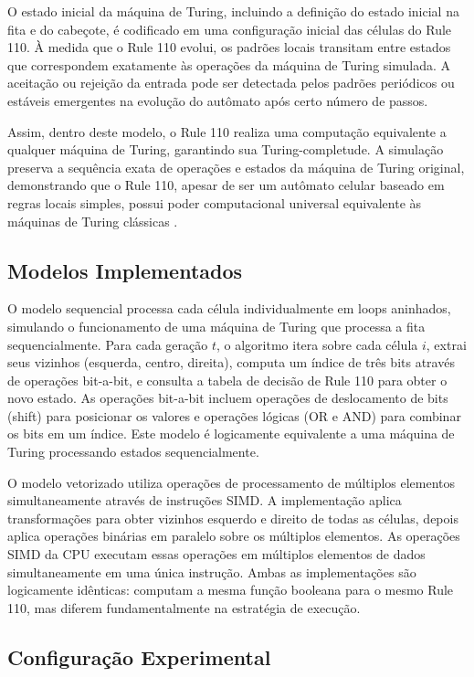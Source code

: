 \documentclass[12pt]{article}
\begin{document}
O estado inicial da máquina de Turing, incluindo a definição do estado inicial na fita e do cabeçote, é codificado em uma configuração inicial das células do Rule 110. À medida que o Rule 110 evolui, os padrões locais transitam entre estados que correspondem exatamente às operações da máquina de Turing simulada. A aceitação ou rejeição da entrada pode ser detectada pelos padrões periódicos ou estáveis emergentes na evolução do autômato após certo número de passos.

Assim, dentro deste modelo, o Rule 110 realiza uma computação equivalente a qualquer máquina de Turing, garantindo sua Turing-completude. A simulação preserva a sequência exata de operações e estados da máquina de Turing original, demonstrando que o Rule 110, apesar de ser um autômato celular baseado em regras locais simples, possui poder computacional universal equivalente às máquinas de Turing clássicas \cite{turing1936, wolfram2002}.

\subsection{Modelos Implementados}

O modelo sequencial processa cada célula individualmente em loops aninhados, simulando o funcionamento de uma máquina de Turing que processa a fita sequencialmente. Para cada geração $t$, o algoritmo itera sobre cada célula $i$, extrai seus vizinhos (esquerda, centro, direita), computa um índice de três bits através de operações bit-a-bit, e consulta a tabela de decisão de Rule 110 para obter o novo estado. As operações bit-a-bit incluem operações de deslocamento de bits (shift) para posicionar os valores e operações lógicas (OR e AND) para combinar os bits em um índice. Este modelo é logicamente equivalente a uma máquina de Turing processando estados sequencialmente.

O modelo vetorizado utiliza operações de processamento de múltiplos elementos simultaneamente através de instruções SIMD. A implementação aplica transformações para obter vizinhos esquerdo e direito de todas as células, depois aplica operações binárias em paralelo sobre os múltiplos elementos. As operações SIMD da CPU executam essas operações em múltiplos elementos de dados simultaneamente em uma única instrução. Ambas as implementações são logicamente idênticas: computam a mesma função booleana para o mesmo Rule 110, mas diferem fundamentalmente na estratégia de execução.

\subsection{Configuração Experimental}
\end{document}
